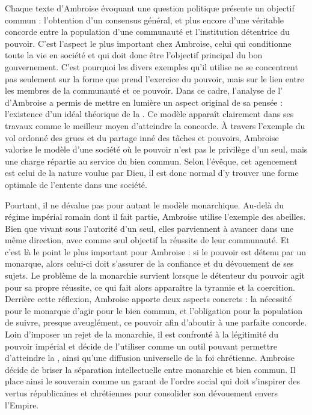 \bigskip

Chaque texte d'Ambroise évoquant une question politique présente un objectif commun : l'obtention d'un consensus général, et plus encore d'une véritable concorde entre la population d'une communauté et l'institution détentrice du pouvoir. C'est l'aspect le plus important chez Ambroise, celui qui conditionne toute la vie en société et qui doit donc être l'objectif principal du bon gouvernement. C'est pourquoi les divers exemples qu'il utilise ne se concentrent pas seulement sur la forme que prend l'exercice du pouvoir, mais sur le lien entre les membres de la communauté et ce pouvoir. Dans ce cadre, l'analyse de l' d'Ambroise a permis de mettre en lumière un aspect original de sa pensée : l'existence d'un idéal théorique de la . Ce modèle apparaît clairement dans ses travaux comme le meilleur moyen d'atteindre la concorde. À travers l'exemple du vol ordonné des grues et du partage inné des tâches et pouvoirs, Ambroise valorise le modèle d'une société où le pouvoir n'est pas le privilège d'un seul, mais une charge répartie au service du bien commun. Selon l'évêque, cet agencement est celui de la nature voulue par Dieu, il est donc normal d'y trouver une forme optimale de l'entente dans une société.

\bigskip

Pourtant, il ne dévalue pas pour autant le modèle monarchique. Au-delà du régime impérial romain dont il fait partie, Ambroise utilise l'exemple des abeilles. Bien que vivant sous l'autorité d'un seul, elles parviennent à avancer dans une même direction, avec comme seul objectif la réussite de leur communauté. Et c'est là le point le plus important pour Ambroise : si le pouvoir est détenu par un monarque, alors celui-ci doit s'assurer de la confiance et du dévouement de ses sujets. Le problème de la monarchie survient lorsque le détenteur du pouvoir agit pour sa propre réussite, ce qui fait alors apparaître la tyrannie et la coercition. Derrière cette réflexion, Ambroise apporte deux aspects concrets : la nécessité pour le monarque d'agir pour le bien commun, et l'obligation pour la population de suivre, presque aveuglément, ce pouvoir afin d'aboutir à une parfaite concorde. Loin d'imposer un rejet de la monarchie, il est confronté à la légitimité du pouvoir impérial et décide de l'utiliser comme un outil pouvant permettre d'atteindre la , ainsi qu'une diffusion universelle de la foi chrétienne. Ambroise décide de briser la séparation intellectuelle entre monarchie et bien commun. Il place ainsi le souverain comme un garant de l'ordre social qui doit s'inspirer des vertus républicaines et chrétiennes pour consolider son dévouement envers l'Empire.

